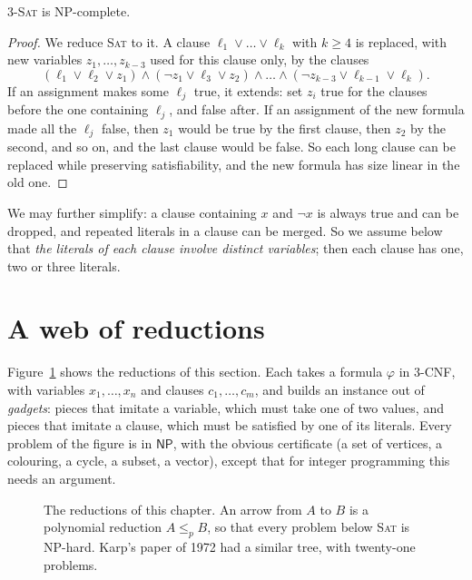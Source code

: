 \begin{theorem}[Karp 1972]\label{thm:threesat}
\textup{\textsc{3-Sat}} is NP-complete.
\end{theorem}

\begin{proof}
We reduce \textup{\textsc{Sat}} to it. A clause $\ell_1\lor\dots\lor\ell_k$ with $k\ge4$ is replaced, with new variables $z_1,\dots,z_{k-3}$ used for this clause only, by the clauses
\[
(\ell_1\lor\ell_2\lor z_1)\land(\neg z_1\lor\ell_3\lor z_2)\land\dots\land(\neg z_{k-3}\lor\ell_{k-1}\lor\ell_k).
\]
If an assignment makes some $\ell_j$ true, it extends: set $z_i$ true for the clauses before the one containing $\ell_j$, and false after. If an assignment of the new formula made all the $\ell_j$ false, then $z_1$ would be true by the first clause, then $z_2$ by the second, and so on, and the last clause would be false. So each long clause can be replaced while preserving satisfiability, and the new formula has size linear in the old one.
\end{proof}

We may further simplify: a clause containing $x$ and $\neg x$ is always true and can be dropped, and repeated literals in a clause can be merged. So we assume below that \emph{the literals of each clause involve distinct variables}; then each clause has one, two or three literals.

\section{A web of reductions}\label{sec:karp}

Figure~\ref{fig:reductions} shows the reductions of this section. Each takes a formula $\varphi$ in 3-CNF, with variables $x_1,\dots,x_n$ and clauses $c_1,\dots,c_m$, and builds an instance out of \emph{gadgets}: pieces that imitate a variable, which must take one of two values, and pieces that imitate a clause, which must be satisfied by one of its literals. Every problem of the figure is in $\mathsf{NP}$, with the obvious certificate (a set of vertices, a colouring, a cycle, a subset, a vector), except that for integer programming this needs an argument.

\begin{figure}[ht]
\centering
{}
\caption{The reductions of this chapter. An arrow from $A$ to $B$ is a polynomial reduction $A\le_pB$, so that every problem below \textup{\textsc{Sat}} is NP-hard. Karp's paper of 1972 had a similar tree, with twenty-one problems.}
\label{fig:reductions}
\end{figure}

